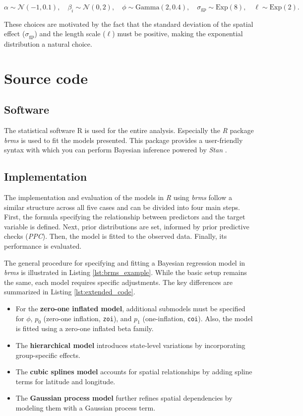 \documentclass[12pt]{article}
\begin{document}
\[
\alpha \sim \mathcal{N}(-1, 0.1), \quad \beta_i \sim \mathcal{N}(0,2), \quad \phi \sim \text{Gamma}(2,0.4), \quad \sigma_{\text{gp}} \sim \text{Exp}(8), \quad \ell \sim \text{Exp}(2).
\]

These choices are motivated by the fact that the standard deviation of the spatial effect (\(\sigma_{\text{gp}}\)) and the length scale (\(\ell\)) must be positive, making the exponential distribution a natural choice.

\section{Source code}

\subsection{Software}

The statistical software R \parencite{R-base} is used for the entire analysis. Especially the \textit{R} package \textit{brms} \parencite{brms} is used to fit the models presented. This package provides a user-friendly syntax with which you can perform Bayesian inference powered by \textit{Stan} \parencite{stan}.

\subsection{Implementation}

The implementation and evaluation of the models in \textit{R} using \textit{brms} follow a similar structure across all five cases and can be divided into four main steps. First, the formula specifying the relationship between predictors and the target variable is defined. Next, prior distributions are set, informed by prior predictive checks (\textit{PPC}). Then, the model is fitted to the observed data. Finally, its performance is evaluated.

The general procedure for specifying and fitting a Bayesian regression model in \textit{brms} is illustrated in Listing \ref{lst:brms_example}. While the basic setup remains the same, each model requires specific adjustments. The key differences are summarized in Listing \ref{lst:extended_code}.

\begin{itemize}
    \item For the \textbf{zero-one inflated model}, additional submodels must be specified for $\phi$, $p_0$ (zero-one inflation, \texttt{zoi}), and $p_1$ (one-inflation, \texttt{coi}). Also, the model is fitted using a zero-one inflated beta family.
    \item The \textbf{hierarchical model} introduces state-level variations by incorporating group-specific effects.
    \item The \textbf{cubic splines model} accounts for spatial relationships by adding spline terms for latitude and longitude.
    \item The \textbf{Gaussian process model} further refines spatial dependencies by modeling them with a Gaussian process term.
\end{itemize}
\end{document}
